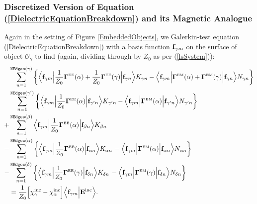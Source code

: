 \documentclass[dvips,letterpaper]{article}
\begin{document}
\subsubsection*{Discretized Version of Equation
                (\ref{DielectricEquationBreakdown}) and its 
                Magnetic Analogue}

Again in the setting of Figure \ref{EmbeddedObjects}, we 
Galerkin-test equation (\ref{DielectricEquationBreakdown}) 
with a basis function $\mathbf{f}_{\gamma m}$ on the surface
of object $\mathcal{O}_\gamma$ to find (again, dividing through
by $Z_0$ as per (\ref{lsSystem})):
\begin{subequations}
\begin{align}
&\sum_{n=1}^{\texttt{NEdges}(\gamma)}  \bigg\{
   \Big\langle 
         \mathbf{f}_{\gamma m} 
   \Big| \frac{1}{Z_0} \boldsymbol{\Gamma}^{\hbox{\tiny{EE}}}(\alpha) + \frac{1}{Z_0} \boldsymbol{\Gamma}^{\hbox{\tiny{EE}}}(\gamma) \Big|
         \mathbf{f}_{\gamma n}
   \Big\rangle 
         K_{\gamma n}
   -
   \Big\langle 
         \mathbf{f}_{\gamma m} 
   \Big| \boldsymbol{\Gamma}^{\hbox{\tiny{EM}}}(\alpha) + \boldsymbol{\Gamma}^{\hbox{\tiny{EM}}}(\gamma) \Big|
         \mathbf{f}_{\gamma n}
   \Big\rangle 
         N_{\gamma n}
  \bigg\}
\nonumber \\
&\sum_{n=1}^{\texttt{NEdges}(\gamma^\prime)}  \bigg\{
   \Big\langle 
         \mathbf{f}_{\gamma m} 
   \Big| \frac{1}{Z_0}\boldsymbol{\Gamma}^{\hbox{\tiny{EE}}}(\alpha) \Big|
         \mathbf{f}_{\gamma^\prime n}
   \Big\rangle 
         K_{\gamma^\prime n}
   -
   \Big\langle 
         \mathbf{f}_{\gamma m} 
   \Big| \boldsymbol{\Gamma}^{\hbox{\tiny{EM}}}(\alpha) \Big|
         \mathbf{f}_{\gamma^\prime n}
   \Big\rangle 
         N_{\gamma^\prime n}
  \bigg\}
\nonumber \\
+&\sum_{n=1}^{\texttt{NEdges}(\beta)} 
   \Big\langle 
         \mathbf{f}_{\gamma m} 
   \Big| \frac{1}{Z_0} \boldsymbol{\Gamma}^{\hbox{\tiny{EE}}}(\alpha) \Big| 
         \mathbf{f}_{\beta n}
   \Big\rangle 
         K_{\beta n}
\nonumber \\
-&\sum_{n=1}^{\texttt{NEdges}(\alpha)} \bigg\{
   \Big\langle 
         \mathbf{f}_{\gamma m} 
   \Big| \frac{1}{Z_0} \boldsymbol{\Gamma}^{\hbox{\tiny{EE}}}(\alpha) \Big| 
         \mathbf{f}_{\alpha n}
   \Big\rangle 
         K_{\alpha n}
   \,-
   \Big\langle 
         \mathbf{f}_{\gamma m} 
   \Big| \boldsymbol{\Gamma}^{\hbox{\tiny{EM}}}(\alpha) \Big| 
         \mathbf{f}_{\alpha n}
   \Big\rangle 
         N_{\alpha n}
  \bigg\}
\nonumber \\
-&\sum_{n=1}^{\texttt{NEdges}(\delta)} \bigg\{
   \Big\langle 
         \mathbf{f}_{\gamma m} 
   \Big| \frac{1}{Z_0} \boldsymbol{\Gamma}^{\hbox{\tiny{EE}}}(\gamma) \Big| 
         \mathbf{f}_{\delta n}
   \Big\rangle 
         K_{\delta n}
   \,-
   \Big\langle 
         \mathbf{f}_{\gamma m} 
   \Big| \boldsymbol{\Gamma}^{\hbox{\tiny{EM}}}(\gamma) \Big| 
         \mathbf{f}_{\delta n}
   \Big\rangle 
         N_{\delta n}
  \bigg\}
\nonumber \\
&=\frac{1}{Z_0} \Big[\chi_\gamma^{\hbox{\scriptsize{inc}}} - \chi_\alpha^{\hbox{\scriptsize{inc}}}\Big] 
   \Big\langle \mathbf{f}_{\gamma m} \Big| \mathbf{E}^{\hbox{\scriptsize{inc}}} \Big\rangle.
\end{align}


\end{subequations}
\end{document}
